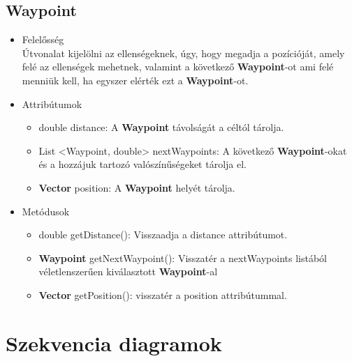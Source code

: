 \subsection{Waypoint}
\begin{itemize}
\item Felelősség\\
Útvonalat kijelölni az ellenségeknek, úgy, hogy megadja a pozícióját, amely felé az ellenségek mehetnek, valamint a következő  \textbf{Waypoint}-ot ami felé menniük kell, ha egyszer elérték ezt a  \textbf{Waypoint}-ot.
\item Attribútumok
	\begin{itemize}
		\item double distance: A  \textbf{Waypoint} távolságát a céltól tárolja.
		\item List <Waypoint, double> nextWaypoints: A következő  \textbf{Waypoint}-okat és a hozzájuk tartozó valószínűségeket tárolja el.
		\item \textbf{Vector} position: A  \textbf{Waypoint} helyét tárolja.
	\end{itemize}
\item Metódusok
	\begin{itemize}
		\item double getDistance(): Visszaadja a distance attribútumot.
		\item \textbf{Waypoint} getNextWaypoint(): Visszatér a nextWaypoints listából véletlenszerűen kiválasztott \textbf{Waypoint}-al
		\item\textbf{Vector} getPosition(): visszatér a position attribútummal.

	\end{itemize}
\end{itemize}



\section{Szekvencia diagramok}

